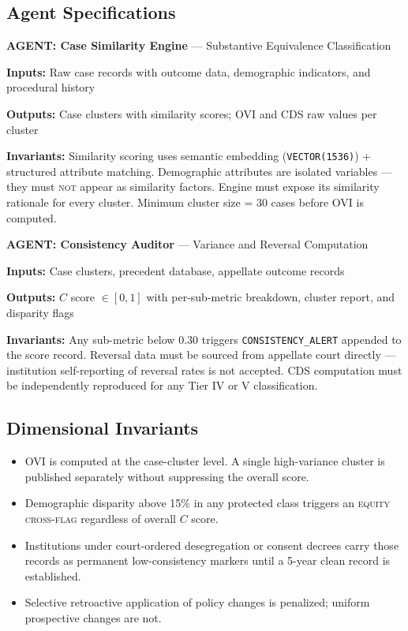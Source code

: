 \documentclass[a4paper,11pt]{article}
\begin{document}
	\subsection{Agent Specifications}
	
	\begin{agentbox}
		\textbf{\sffamily\color{navy} AGENT: Case Similarity Engine} — Substantive Equivalence Classification
		
		\medskip
		\textbf{Inputs:} Raw case records with outcome data, demographic indicators, and procedural history
		
		\textbf{Outputs:} Case clusters with similarity scores; OVI and CDS raw values per cluster
		
		\textbf{Invariants:} Similarity scoring uses semantic embedding (\texttt{VECTOR(1536)}) + structured attribute matching. Demographic attributes are isolated variables — they must \textsc{not} appear as similarity factors. Engine must expose its similarity rationale for every cluster. Minimum cluster size = 30 cases before OVI is computed.
	\end{agentbox}
	
	\medskip
	
	\begin{agentbox}
		\textbf{\sffamily\color{navy} AGENT: Consistency Auditor} — Variance and Reversal Computation
		
		\medskip
		\textbf{Inputs:} Case clusters, precedent database, appellate outcome records
		
		\textbf{Outputs:} $C$ score $\in [0,1]$ with per-sub-metric breakdown, cluster report, and disparity flags
		
		\textbf{Invariants:} Any sub-metric below 0.30 triggers \texttt{CONSISTENCY\_ALERT} appended to the score record. Reversal data must be sourced from appellate court directly — institution self-reporting of reversal rates is not accepted. CDS computation must be independently reproduced for any Tier IV or V classification.
	\end{agentbox}
	
	\subsection{Dimensional Invariants}
	
	\begin{itemize}[leftmargin=1.5em]
		\item OVI is computed at the case-cluster level. A single high-variance cluster is published separately without suppressing the overall score.
		\item Demographic disparity above 15\% in any protected class triggers an \textsc{equity cross-flag} regardless of overall $C$ score.
		\item Institutions under court-ordered desegregation or consent decrees carry those records as permanent low-consistency markers until a 5-year clean record is established.
		\item Selective retroactive application of policy changes is penalized; uniform prospective changes are not.
	\end{itemize}
	
\end{document}
